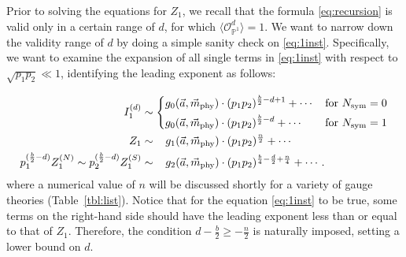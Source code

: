 \documentclass[letterpaper, 11pt]{article}
\newcommand{\nn}{\nonumber}
\def\IP{\mathbb{P}}
\begin{document}
Prior to solving the equations  for $Z_1$, we recall that the formula \eqref{eq:recursion} is valid only in a certain range of $d$, for which $\langle \mathcal{O}_{\IP^1}^{d}\rangle = 1$. We want to narrow down the validity range of $d$ by doing a simple sanity check on \eqref{eq:1inst}. Specifically, we want to examine the expansion of all single terms in  \eqref{eq:1inst} with respect to $\sqrt{p_1p_2} \ll 1$, identifying the leading exponent as follows:{\allowdisplaybreaks
\begin{align}
  I_1^{(d)} &\sim \begin{dcases}
    g_0(\vec{a},  \vec{m}_{\text{phy}})\cdot  (p_1p_2)^{\frac{b}{2}-d + 1} + \cdots   &  \text{for }N_\text{sym} = 0\\
    g_0(\vec{a},  \vec{m}_{\text{phy}})\cdot (p_1p_2)^{\frac{b}{2}-d } + \cdots    &  \text{for }N_\text{sym} = 1
\end{dcases}
  \nn \\
  Z_1 &\sim   \ \ \, g_1(\vec{a},  \vec{m}_{\text{phy}})\cdot (p_1p_2)^{\frac{n}{2}}  + \cdots  \nn \\
  p_1^{(\frac{b}{2}-d)}Z_1^{(N)}\sim p_2^{(\frac{b}{2}-d)}  Z^{(S)}_1 &\sim  \ \ \,  g_2(\vec{a},  \vec{m}_{\text{phy}})\cdot  (p_1p_2)^{\frac{b}{4}-\frac{d}{2}+\frac{n}{4}}   + \cdots   .
\end{align}
where a numerical value of $n$ will be discussed shortly for a variety of gauge theories (Table~\ref{tbl:list}).
Notice that for the equation \eqref{eq:1inst} to be true, some terms on the right-hand side should have the leading exponent less than or equal to that of $Z_1$. Therefore, the condition $d - \frac{b}{2} \geq -\frac{n}{2}$ is  naturally imposed, setting a lower bound on $d$. 

}
\end{document}
